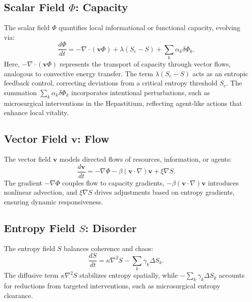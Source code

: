 \documentclass[12pt]{article}
\begin{document}
\subsection{Scalar Field \(\Phi\): Capacity}
\label{subsec:scalar_field}

The scalar field \(\Phi\) quantifies local informational or functional capacity, evolving via:
\begin{equation}
\frac{d\Phi}{dt} = -\nabla \cdot (\mathbf{v} \Phi) + \lambda (S_c - S) + \sum_k \alpha_k \delta \Phi_k.
\label{eq:phi_dynamics}
\end{equation}
Here, \(-\nabla \cdot (\mathbf{v} \Phi)\) represents the transport of capacity through vector flows, analogous to convective energy transfer. The term \(\lambda (S_c - S)\) acts as an entropic feedback control, correcting deviations from a critical entropy threshold \(S_c\). The summation \(\sum_k \alpha_k \delta \Phi_k\) incorporates intentional perturbations, such as microsurgical interventions in the Hepastitium, reflecting agent-like actions that enhance local vitality.

\subsection{Vector Field \(\mathbf{v}\): Flow}
\label{subsec:vector_field}

The vector field \(\mathbf{v}\) models directed flows of resources, information, or agents:
\begin{equation}
\frac{d\mathbf{v}}{dt} = -\nabla \Phi - \beta (\mathbf{v} \cdot \nabla) \mathbf{v} + \xi \nabla S.
\label{eq:v_dynamics}
\end{equation}
The gradient \(-\nabla \Phi\) couples flow to capacity gradients, \(-\beta (\mathbf{v} \cdot \nabla) \mathbf{v}\) introduces nonlinear advection, and \(\xi \nabla S\) drives adjustments based on entropy gradients, ensuring dynamic responsiveness.

\subsection{Entropy Field \(S\): Disorder}
\label{subsec:entropy_field}

The entropy field \(S\) balances coherence and chaos:
\begin{equation}
\frac{dS}{dt} = \kappa \nabla^2 S - \sum_k \gamma_k \Delta S_k.
\label{eq:s_dynamics}
\end{equation}
The diffusive term \(\kappa \nabla^2 S\) stabilizes entropy spatially, while \(-\sum_k \gamma_k \Delta S_k\) accounts for reductions from targeted interventions, such as microsurgical entropy clearance.
\end{document}
